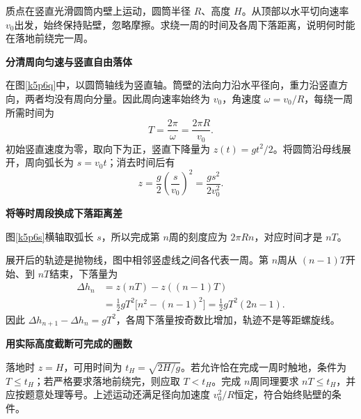 \begin{question}\begin{example}[圆筒内壁上的下落轨迹]\label{k5p6}
质点在竖直光滑圆筒内壁上运动，圆筒半径 $R$、高度 $H$。从顶部以水平切向速率 $v_0$出发，始终保持贴壁，忽略摩擦。求绕一周的时间及各周下落距离，说明何时能在落地前绕完一周。\end{example}
\end{question}
\begin{solution}\textbf{分清周向匀速与竖直自由落体}\par\nobreak
在图\ref{k5p6q}中，以圆筒轴线为竖直轴。筒壁的法向力沿水平径向，重力沿竖直方向，两者均没有周向分量。因此周向速率始终为 $v_0$，角速度 $\omega=v_0/R$，每绕一周所需时间为
\[\boxed{T=\frac{2\pi}{\omega}=\frac{2\pi R}{v_0}}.\]
初始竖直速度为零，取向下为正，竖直下降量为 $z(t)=gt^2/2$。将圆筒沿母线展开，周向弧长为 $s=v_0t$；消去时间后有
\[z=\frac{g}{2}\left(\frac{s}{v_0}\right)^2
 =\frac{gs^2}{2v_0^2}.\]



\par\medskip{}\noindent\textbf{将等时周段换成下落距离差}\par\nobreak
图\ref{k5p6s}横轴取弧长 $s$，所以完成第 $n$周的刻度应为 $2\pi Rn$，对应时间才是 $nT$。

展开后的轨迹是抛物线，图中相邻竖虚线之间各代表一周。第 $n$周从 $(n-1)T$开始、到 $nT$结束，下落量为
\begin{align*}
\Delta h_n
 &=z(nT)-z((n-1)T)\\
 &=\frac12gT^2\bigl[n^2-(n-1)^2\bigr]
  =\boxed{\frac12gT^2(2n-1)}.
\end{align*}
因此 $\Delta h_{n+1}-\Delta h_n=gT^2$，各周下落量按奇数比增加，轨迹不是等距螺旋线。



\par\medskip{}\noindent\textbf{用实际高度截断可完成的圈数}\par\nobreak
落地时 $z=H$，可用时间为 $t_H=\sqrt{2H/g}$。若允许恰在完成一周时触地，条件为 $T\le t_H$；若严格要求落地前绕完，则应取 $T<t_H$。完成 $n$周同理要求 $nT\le t_H$，并应按题意处理等号。上述运动还满足径向加速度 $v_0^2/R$恒定，符合始终贴壁的条件。\end{solution}

